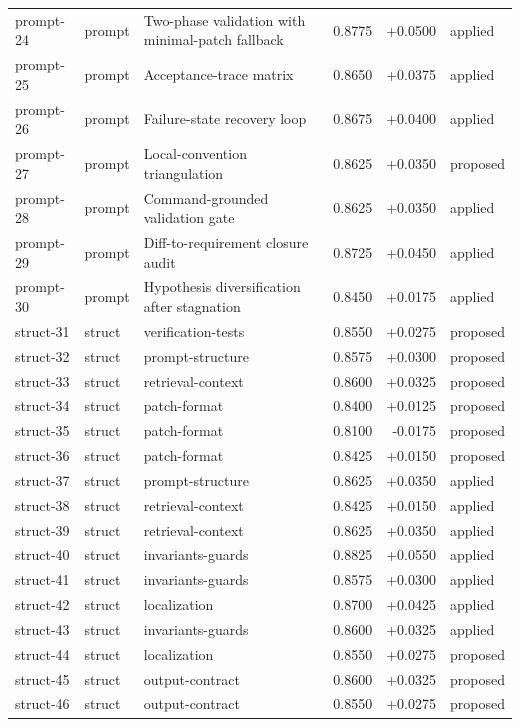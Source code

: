 \begin{center}
\begin{longtable}{llp{5.2cm}rrl}
prompt-24 & prompt & Two-phase validation with minimal-patch fallback & 0.8775 & +0.0500 & applied \\
prompt-25 & prompt & Acceptance-trace matrix & 0.8650 & +0.0375 & applied \\
prompt-26 & prompt & Failure-state recovery loop & 0.8675 & +0.0400 & applied \\
prompt-27 & prompt & Local-convention triangulation & 0.8625 & +0.0350 & proposed \\
prompt-28 & prompt & Command-grounded validation gate & 0.8625 & +0.0350 & applied \\
prompt-29 & prompt & Diff-to-requirement closure audit & 0.8725 & +0.0450 & applied \\
prompt-30 & prompt & Hypothesis diversification after stagnation & 0.8450 & +0.0175 & applied \\
struct-31 & struct & verification-tests & 0.8550 & +0.0275 & proposed \\
struct-32 & struct & prompt-structure & 0.8575 & +0.0300 & proposed \\
struct-33 & struct & retrieval-context & 0.8600 & +0.0325 & proposed \\
struct-34 & struct & patch-format & 0.8400 & +0.0125 & proposed \\
struct-35 & struct & patch-format & 0.8100 & -0.0175 & proposed \\
struct-36 & struct & patch-format & 0.8425 & +0.0150 & proposed \\
struct-37 & struct & prompt-structure & 0.8625 & +0.0350 & applied \\
struct-38 & struct & retrieval-context & 0.8425 & +0.0150 & applied \\
struct-39 & struct & retrieval-context & 0.8625 & +0.0350 & applied \\
struct-40 & struct & invariants-guards & 0.8825 & +0.0550 & applied \\
struct-41 & struct & invariants-guards & 0.8575 & +0.0300 & applied \\
struct-42 & struct & localization & 0.8700 & +0.0425 & applied \\
struct-43 & struct & invariants-guards & 0.8600 & +0.0325 & applied \\
struct-44 & struct & localization & 0.8550 & +0.0275 & proposed \\
struct-45 & struct & output-contract & 0.8600 & +0.0325 & proposed \\
struct-46 & struct & output-contract & 0.8550 & +0.0275 & proposed \\

\end{longtable}
\end{center}
